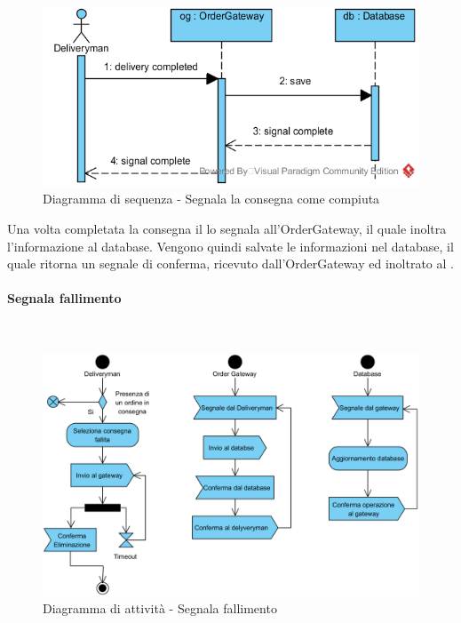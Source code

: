 \begin{figure}[H]
	\centering
	\includegraphics[width=14cm]{../../documenti/SpecificaTecnica/diagrammi_img/sequenza/fattorino_segnala_consegna_completata.png}
	\caption{Diagramma di sequenza - Segnala la consegna come compiuta}
\end{figure}
Una volta completata la consegna il \Deliveryman{} lo segnala all'Order\-Gateway, il quale inoltra l'informazione al database. Vengono quindi salvate le informazioni nel database, il quale ritorna un segnale di conferma, ricevuto dall'Order\-Gateway ed inoltrato al \Deliveryman{}.


\paragraph{Segnala fallimento}\mbox{}\\
\nopagebreak
\begin{figure}[H]
	\centering
	\includegraphics[width=14cm]{diagrammi_img/attivita/delivetyman_fallimento.png}
	\caption{Diagramma di attività - Segnala fallimento}
\end{figure}


